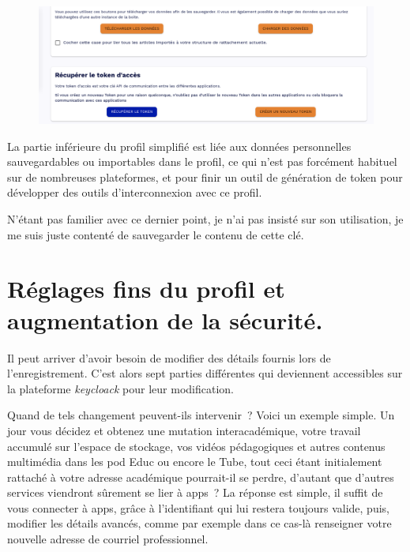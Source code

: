 \begin{figure}
	\centering
	\includegraphics{./Captures/portail.profil.bas.png}
	\caption{}
\end{figure}
La partie inférieure du profil simplifié est liée aux données personnelles sauvegardables ou importables dans le profil, ce qui n'est pas forcément habituel sur de nombreuses plateformes, et pour finir un outil de génération de token pour développer des outils d'interconnexion avec ce profil.

N'étant pas familier avec ce dernier point, je n'ai pas insisté sur son utilisation, je me suis juste contenté de sauvegarder le contenu de cette clé.

\section{Réglages fins du profil et augmentation de la sécurité.} \label{ssec-profil-detail}
Il peut arriver d'avoir besoin de modifier des détails fournis lors de l'enregistrement. 
C'est alors sept parties différentes qui deviennent accessibles sur la plateforme \emph{keycloack} pour leur modification. 

Quand de tels changement peuvent-ils intervenir~? 
Voici un exemple simple. 
Un jour vous décidez et obtenez une mutation interacadémique, votre travail accumulé sur l'espace de stockage, vos vidéos pédagogiques et autres contenus multimédia dans les pod Educ ou encore le Tube, tout ceci étant initialement rattaché à votre adresse académique pourrait-il se perdre, d'autant que d'autres services viendront sûrement se lier à apps~?
La réponse est simple, il suffit de vous connecter à apps, grâce à l'identifiant qui lui restera toujours valide, puis, modifier les détails avancés, comme par exemple dans ce cas-là renseigner votre nouvelle adresse de courriel professionnel. 

